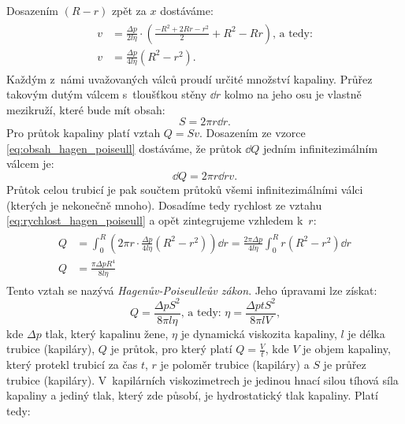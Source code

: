 \documentclass[12pt]{article}
\begin{document}
Dosazením $(R-r)$ zpět za $x$ dostáváme:
\begin{align}
    \begin{split}
        v &= \frac{\Delta p}{2l\eta}\cdot\left(\frac{-R^2+2Rr-r^2}{2}+R^2-Rr\right)\text{, a tedy:}\\
        v &= \frac{\Delta p}{4l\eta}(R^2-r^2)\text{.}
        \label{eq:rychlost_hagen_poiseull}
    \end{split}
\end{align}
Každým z~námi uvažovaných válců proudí určité množství kapaliny. Průřez takovým dutým válcem s~tloušťkou stěny $\dd r$ kolmo na jeho osu je vlastně mezikruží, které bude mít obsah:
\begin{equation}
    S = 2\pi r\dd r\text{.}
    \label{eq:obsah_hagen_poiseull}
\end{equation}
Pro průtok kapaliny platí vztah $Q = Sv$. Dosazením ze vzorce \ref{eq:obsah_hagen_poiseull} dostáváme, že průtok $\dd Q$ jedním infinitezimálním válcem je:~\cite{book:Calibration_of_viscometers}
\begin{equation}
    \dd Q = 2\pi r\dd rv\text{.}
\end{equation}
Průtok celou trubicí je pak součtem průtoků všemi infinitezimálními válci (kterých je nekonečně mnoho). Dosadíme tedy rychlost ze vztahu \ref{eq:rychlost_hagen_poiseull} a opět zintegrujeme vzhledem k~$r$:~\cite{book:Calibration_of_viscometers}
\begin{align}
    \begin{split}
        Q &= \int_0^R\left(2\pi r\cdot \frac{\Delta p}{4l\eta}(R^2-r^2)\right)\dd r = \frac{2\pi\Delta p}{4l\eta}\int_0^R r(R^2-r^2)\dd r\\
        Q &= \frac{\pi\Delta pR^4}{8l\eta}
    \end{split}
\end{align}
Tento vztah se nazývá \emph{Hagenův-Poiseulleův zákon}. Jeho úpravami lze získat:~\cite{wiki:Hagen-Poiseulle_equation}\cite{thesis:Viskozimetr_pro_viskozni_materialy}
\begin{equation}
    Q = \frac{\Delta pS^2}{8\pi l\eta}\text{, a tedy: } \eta = \frac{\Delta ptS^2}{8\pi lV}\text{,}
    \label{eq:Hagen_Poiseull}
\end{equation}
kde $\Delta p$ tlak, který kapalinu žene, $\eta$ je dynamická viskozita kapaliny, $l$ je délka trubice (kapiláry), $Q$ je průtok, pro který platí $Q=\frac{V}{t}$, kde $V$ je objem kapaliny, který protekl trubicí za čas $t$, $r$ je poloměr trubice (kapiláry) a $S$ je průřez trubice (kapiláry). V~kapilárních viskozimetrech je jedinou hnací silou tíhová síla kapaliny a jediný tlak, který zde působí, je hydrostatický tlak kapaliny. Platí tedy:
\end{document}
